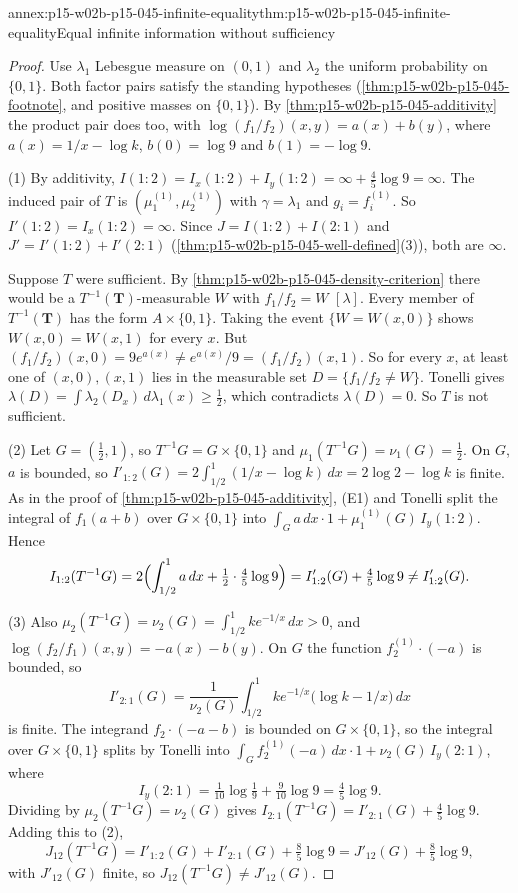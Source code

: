 \begin{annexitem}{annex:p15-w02b-p15-045-infinite-equality}{thm:p15-w02b-p15-045-infinite-equality}{Equal infinite information without sufficiency}
\begin{proof}
Use \(\lambda_1\) Lebesgue measure on \((0,1)\) and \(\lambda_2\) the
uniform probability on \(\{0,1\}\). Both factor pairs satisfy the
standing hypotheses (\cref{thm:p15-w02b-p15-045-footnote}, and positive
masses on \(\{0,1\}\)). By \cref{thm:p15-w02b-p15-045-additivity} the
product pair does too, with
\(\log(f_1/f_2)(x,y)=a(x)+b(y)\), where \(a(x)=1/x-\log k\),
\(b(0)=\log9\) and \(b(1)=-\log9\).

(1) By additivity, \(I(1:2)=I_x(1:2)+I_y(1:2)=\infty+\tfrac45\log9=\infty\).
The induced pair of \(T\) is \((\mu_1^{(1)},\mu_2^{(1)})\) with
\(\gamma=\lambda_1\) and \(g_i=f_i^{(1)}\). So
\(I'(1:2)=I_x(1:2)=\infty\). Since \(J=I(1:2)+I(2:1)\) and
\(J'=I'(1:2)+I'(2:1)\) (\cref{thm:p15-w02b-p15-045-well-defined}(3)),
both are \(\infty\).

Suppose \(T\) were sufficient. By
\cref{thm:p15-w02b-p15-045-density-criterion} there would be a
\(T^{-1}(\mathbf T)\)-measurable \(W\) with \(f_1/f_2=W\) \([\lambda]\).
Every member of \(T^{-1}(\mathbf T)\) has the form \(A\times\{0,1\}\).
Taking the event \(\{W=W(x,0)\}\) shows \(W(x,0)=W(x,1)\) for every
\(x\). But \((f_1/f_2)(x,0)=9e^{a(x)}\neq e^{a(x)}/9=(f_1/f_2)(x,1)\).
So for every \(x\), at least one of \((x,0),(x,1)\) lies in the
measurable set \(D=\{f_1/f_2\neq W\}\). Tonelli gives
\(\lambda(D)=\int\lambda_2(D_x)\,d\lambda_1(x)\geq\tfrac12\), which
contradicts \(\lambda(D)=0\). So \(T\) is not sufficient.

(2) Let \(G=(\tfrac12,1)\), so \(T^{-1}G=G\times\{0,1\}\) and
\(\mu_1(T^{-1}G)=\nu_1(G)=\tfrac12\). On \(G\), \(a\) is bounded, so
\(I'_{1:2}(G)=2\int_{1/2}^1(1/x-\log k)\,dx=2\log2-\log k\) is finite.
As in the proof of \cref{thm:p15-w02b-p15-045-additivity}, (E1) and
Tonelli split the integral of \(f_1(a+b)\) over \(G\times\{0,1\}\) into
\(\int_Ga\,dx\cdot1+\mu_1^{(1)}(G)\,I_y(1:2)\). Hence
\[
  I_{1:2}(T^{-1}G)=2\Bigl(\int_{1/2}^1a\,dx+\tfrac12\cdot\tfrac45\log9\Bigr)
                 =I'_{1:2}(G)+\tfrac45\log9\neq I'_{1:2}(G).
\]

(3) Also \(\mu_2(T^{-1}G)=\nu_2(G)=\int_{1/2}^1ke^{-1/x}\,dx>0\), and
\(\log(f_2/f_1)(x,y)=-a(x)-b(y)\). On \(G\) the function
\(f_2^{(1)}\cdot(-a)\) is bounded, so
\[
  I'_{2:1}(G)=\frac1{\nu_2(G)}\int_{1/2}^1ke^{-1/x}\bigl(\log k-1/x\bigr)\,dx
\]
is finite. The integrand \(f_2\cdot(-a-b)\) is bounded on
\(G\times\{0,1\}\), so the integral over \(G\times\{0,1\}\) splits by
Tonelli into \(\int_Gf_2^{(1)}(-a)\,dx\cdot1+\nu_2(G)\,I_y(2:1)\), where
\[
  I_y(2:1)=\tfrac1{10}\log\tfrac19+\tfrac9{10}\log9=\tfrac45\log9 .
\]
Dividing by \(\mu_2(T^{-1}G)=\nu_2(G)\) gives
\(I_{2:1}(T^{-1}G)=I'_{2:1}(G)+\tfrac45\log9\). Adding this to (2),
\[
  J_{12}(T^{-1}G)=I'_{1:2}(G)+I'_{2:1}(G)+\tfrac85\log9
                 =J'_{12}(G)+\tfrac85\log9 ,
\]
with \(J'_{12}(G)\) finite, so \(J_{12}(T^{-1}G)\neq J'_{12}(G)\).
\end{proof}
\end{annexitem}


